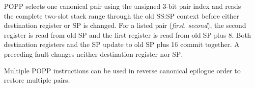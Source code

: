 POPP selects one canonical pair using the unsigned 3-bit pair index and reads the complete two-slot stack range
through the old SS:SP context before either destination register or SP is changed. For a listed pair
(\emph{first}, \emph{second}), the second register is read from old SP and the first register is read from old SP
plus 8. Both destination registers and the SP update to old SP plus 16 commit together. A preceding fault changes
neither destination register nor SP.

Multiple POPP instructions can be used in reverse canonical epilogue order to restore multiple pairs.
